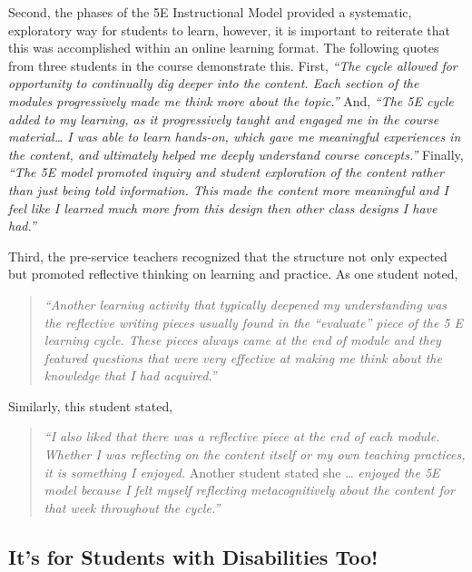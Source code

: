 \documentclass[11.5pt]{sig-alternate} %
\begin{document}
\begin{large}
Second, the phases of the 5E Instructional Model provided a systematic, exploratory way for students to learn, however, it is important to reiterate that this was accomplished within an online learning format. The following quotes from three students in the course demonstrate this. First, \textit{“The cycle allowed for opportunity to continually dig deeper into the content. Each section of the modules progressively made me think more about the topic.”} And, \textit{“The 5E cycle added to my learning, as it progressively taught and engaged me in the course material… I was able to learn hands-on, which gave me meaningful experiences in the content, and ultimately helped me deeply understand course concepts.”} Finally, \textit{“The 5E model promoted inquiry and student exploration of the content rather than just being told information. This made the content more meaningful and I feel like I learned much more from this design then other class designs I have had.”}

Third, the pre-service teachers recognized that the structure not only expected but promoted reflective thinking on learning and practice.  As one student noted, 

\begin{quote}
    \textit{“Another learning activity that typically deepened my understanding was the reflective writing pieces usually found in the “evaluate” piece of the 5 E learning cycle. These pieces always came at the end of module and they featured questions that were very effective at making me think about the knowledge that I had acquired.”}
\end{quote}

Similarly, this student stated, 

\begin{quote}
    \textit{“I also liked that there was a reflective piece at the end of each module. Whether I was reflecting on the content itself or my own teaching practices, it is something I enjoyed.} Another student stated she … \textit{enjoyed the 5E model because I felt myself reflecting metacognitively about the content for that week throughout the cycle.”} 
\end{quote}

\subsection*{It's for Students with Disabilities Too!}


\end{large}
\end{document}
